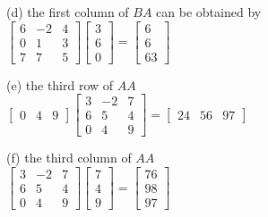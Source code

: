 \documentclass[addpoints]{exam}
\begin{document}
\begin{sloppypar}
\begin{questions}
\begin{solution}
        (d) the first column of $BA$ can be obtained by \\ 
        $ \begin{bmatrix}
            6 & -2 & 4 \\ 
            0 & 1 & 3 \\ 
            7 & 7 & 5
        \end{bmatrix} \begin{bmatrix}
            3 \\ 6 \\ 0
        \end{bmatrix} = \begin{bmatrix}
            6 \\ 6 \\ 63
        \end{bmatrix}$

        (e) the third row of $AA$ \\ 
        $ \begin{bmatrix}
            0 & 4 & 9
        \end{bmatrix} \begin{bmatrix}
            3 & -2 & 7 \\ 
            6 & 5 & 4 \\ 
            0 & 4 & 9
        \end{bmatrix} = \begin{bmatrix}
            24 & 56 & 97
        \end{bmatrix} $

        (f) the third column of $AA$ \\ 
        $ \begin{bmatrix}
            3 & -2 & 7 \\ 
            6 & 5 & 4 \\ 
            0 & 4 & 9
        \end{bmatrix} \begin{bmatrix}
            7 \\ 4 \\ 9
        \end{bmatrix} = \begin{bmatrix}
            76 \\ 98 \\ 97
        \end{bmatrix}$
    \end{solution}


\end{questions}
\end{sloppypar}
\end{document}
